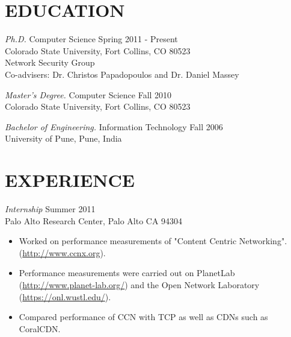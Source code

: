 \documentclass[line,margin]{res}
\begin{document}
\address{1400 W. Elizabeth St. Apt. 221 Fort Collins CO 80521}
\address{(970)261-1699}
\address{kaustubh.gadkari@gmail.com}


\begin{resume}



\section{EDUCATION}
                {\sl Ph.D.} Computer Science \hfill Spring 2011 - Present\\
                    Colorado State University, Fort Collins, CO 80523\\
                    Network Security Group\\
                    Co-advisers: Dr. Christos Papadopoulos and Dr. Daniel Massey

                {\sl Master's Degree.} Computer Science \hfill Fall 2010\\
                    Colorado State University, Fort Collins, CO 80523
                    
                {\sl Bachelor of Engineering.} Information Technology \hfill Fall 2006\\
                	  University of Pune, Pune, India

\section{EXPERIENCE}
    {\sl Internship} \hfill Summer 2011\\
      Palo Alto Research Center, Palo Alto CA 94304 \\
      \begin{itemize}
      \item Worked on performance measurements of "Content Centric Networking".(\url{http://www.ccnx.org}).
      \item Performance measurements were carried out on PlanetLab (\url{http://www.planet-lab.org/}) and the Open Network
      Laboratory (\url{https://onl.wustl.edu/}).
      \item Compared performance of CCN with TCP as well as CDNs such as CoralCDN.
      \end{itemize}
      


\end{resume}
\end{document}
